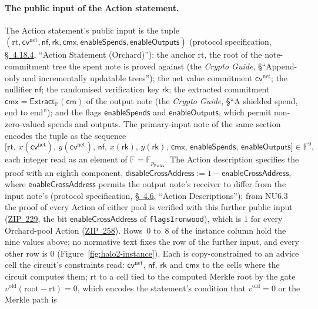 \documentclass[11pt,a4paper]{article}
\theoremstyle{definition}
\newcommand{\F}{\mathbb{F}}
\newcommand{\PP}{\mathbb{P}}
\newcommand{\nfsym}{\mathsf{nf}}
\newcommand{\cmsym}{\mathsf{cm}}
\newcommand{\cmx}{\mathsf{cmx}}
\newcommand{\cvsym}{\mathsf{cv}}
\newcommand{\rk}{\mathsf{rk}}
\newcommand{\Pallas}{\ensuremath{\mathsf{Pallas}}}
\newcommand{\Extract}{\ensuremath{\mathsf{Extract}}}
\begin{document}
\paragraph{The public input of the Action statement.}
The Action statement's public input is the tuple
$(\mathrm{rt},\allowbreak \cvsym^{\mathrm{net}},\allowbreak \nfsym,\allowbreak
\rk,\allowbreak \cmx,\allowbreak \mathsf{enableSpends},\allowbreak
\mathsf{enableOutputs})$ (protocol specification,
\href{https://zips.z.cash/protocol/protocol.pdf\#actionstatement}{\S~4.18.4},
``Action Statement (Orchard)''): the anchor $\mathrm{rt}$, the root of the
note-commitment tree the spent note is proved against (the \emph{Crypto
Guide}, \S``Append-only and incrementally updatable trees''); the net
value commitment $\cvsym^{\mathrm{net}}$; the nullifier $\nfsym$; the
randomised verification key $\rk$; the extracted commitment
$\cmx = \Extract_{\PP}(\cmsym)$ of the output note (the \emph{Crypto
Guide}, \S``A shielded spend, end to end''); and the flags
$\mathsf{enableSpends}$ and $\mathsf{enableOutputs}$, which permit
non-zero-valued spends and outputs. The primary-input note of the same
section encodes the tuple as the sequence
\[
\bigl[\mathrm{rt},\, x(\cvsym^{\mathrm{net}}),\,
  y(\cvsym^{\mathrm{net}}),\, \nfsym,\, x(\rk),\, y(\rk),\, \cmx,\,
  \mathsf{enableSpends},\, \mathsf{enableOutputs}\bigr] \in \F^{9},
\]
each integer read as an element of $\F = \F_{p_{\Pallas}}$. The Action
description specifies the proof with an eighth component,
$\mathsf{disableCrossAddress} := 1 - \mathsf{enableCrossAddress}$, where
$\mathsf{enableCrossAddress}$ permits the output note's receiver to
differ from the input note's (protocol specification,
\href{https://zips.z.cash/protocol/nu6_3.pdf\#actiondesc}{\S~4.6},
``Action Descriptions''); from NU6.3 the proof of every Action of either
pool is verified with this further public input
(\href{https://zips.z.cash/zip-0229}{ZIP~229}, the bit
$\mathsf{enableCrossAddress}$ of \texttt{flagsIronwood}), which is $1$ for
every Orchard-pool Action (\href{https://zips.z.cash/zip-0258}{ZIP~258}).
Rows~$0$ to~$8$ of the instance column hold the nine values above; no
normative text fixes the row of the further input, and every other row is
$0$ (Figure~\ref{fig:halo2-instance}). Each is copy-constrained to an advice
cell the circuit's constraints read: $\cvsym^{\mathrm{net}}$, $\nfsym$,
$\rk$ and $\cmx$ to the cells where the circuit computes them;
$\mathrm{rt}$ to a cell tied to the computed Merkle root by the gate
$v^{\mathrm{old}}(\mathrm{root} - \mathrm{rt}) = 0$, which encodes the
statement's condition that $v^{\mathrm{old}} = 0$ or the Merkle path is
\end{document}
